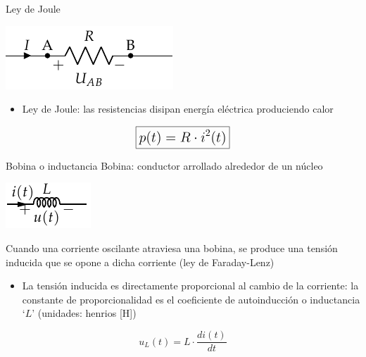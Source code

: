 \documentclass[aspectratio=169, xcolor={usenames,svgnames,dvipsnames}]{beamer}
\begin{document}

\begin{frame}{Ley de Joule}
    \begin{center}
    \includegraphics[height=0.2\textheight]{../figs/Resistencia.pdf}
    \end{center}
    
    \begin{itemize}
    \item \alert{Ley de Joule}: las resistencias disipan energía eléctrica produciendo \alert{calor}
    \end{itemize}
    
    
    \[
    \Large \boxed{p(t)=R\cdot i^{2}(t)}
    \]
\end{frame}


\begin{frame}{Bobina o inductancia}
    \alert{Bobina:} conductor arrollado alrededor de un núcleo
    \begin{center}
    \includegraphics[height=0.2\textheight]{../figs/Bobina.pdf}
    \end{center}

    Cuando una corriente oscilante atraviesa una bobina, se produce una \alert{tensión inducida que se opone a dicha corriente} (ley de Faraday-Lenz)

    \begin{itemize}
        \item La tensión inducida es directamente \alert{proporcional al cambio de la corriente}: la constante de proporcionalidad es el coeficiente de autoinducción o \alert{inductancia} `$L$' (unidades: henrios [H])
    \end{itemize}
    \[
        \boxed{ u_L(t)=L\cdot\frac{di(t)}{dt} } %
    \]
    
\end{frame}
\end{document}
